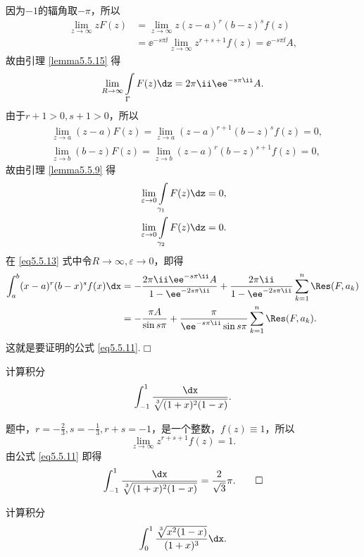 因为$-1$的辐角取$-\pi$，所以
\begin{align*}
\lim_{z\to\infty}zF(z)&=\lim_{z\to\infty}z(z-a)^r(b-z)^sf(z)\\
&=\ee^{-s\pi\ii}\lim_{z\to\infty}z^{r+s+1}f(z)=\ee^{-s\pi\ii}A,
\end{align*}
故由引理 \ref{lemma5.5.15} 得
\[\lim_{R\to\infty}\int\limits_{\Gamma}F(z)\dz=2\pi\ii\ee^{-s\pi\ii}A.\]
由于$r+1>0,s+1>0$，所以
\begin{align*}
&\lim_{z\to a}(z-a)F(z)=\lim_{z\to a}(z-a)^{r+1}(b-z)^sf(z)=0,\\
&\lim_{z\to b}(b-z)F(z)=\lim_{z\to b}(z-a)^{r}(b-z)^{s+1}f(z)=0,
\end{align*}
故由引理 \ref{lemma5.5.9} 得
\begin{align*}
&\lim_{\varepsilon\to0}\int\limits_{\gamma_1}F(z)\dz=0,\\
&\lim_{\varepsilon\to0}\int\limits_{\gamma_2}F(z)\dz=0.
\end{align*}
在 \eqref{eq5.5.13} 式中令$R\to\infty,\varepsilon\to0$，即得
\begin{align*}
\int_a^b(x-a)^r(b-x)^sf(x)\dx&=-\frac{2\pi\ii\ee^{-s\pi\ii}A}{1-\ee^{-2s\pi\ii}}
+\frac{2\pi\ii}{1-\ee^{-2s\pi\ii}}\sum_{k=1}^n\Res(F,a_k)\\
&=-\frac{\pi A}{\sin s\pi}+\frac\pi{\ee^{-s\pi\ii}\sin
s\pi}\sum_{k=1}^n\Res(F,a_k).
\end{align*}
这就是要证明的公式 \eqref{eq5.5.11}.\hfill$\Box$
\begin{example}\label{exam5.5.16}
计算积分
\[\int_{-1}^1\frac{\dx}{\sqrt[\leftroot{-1}\uproot{2}3]{(1+x)^2(1-x)}}.\]
\end{example}
\begin{solution}
题中，$r=-\frac23,s=-\frac13,r+s=-1$，是一个整数，$f(z)\equiv1$，所以
\[\lim_{z\to\infty}z^{r+s+1}f(z)=1.\]
由公式 \eqref{eq5.5.11} 即得
\begin{equation*}
  \int_{-1}^1\frac{\dx}{\sqrt[\leftroot{-1}\uproot{2}3]{(1+x)^2(1-x)}} = \frac2{\sqrt3}\pi. \qedhere
\end{equation*}
\end{solution}
\begin{example}\label{exam5.5.17}
计算积分
\[\int_0^1\frac{\sqrt[\leftroot{-1}\uproot{2}3]{x^2(1-x)}}{(1+x)^3}\dx.\]
\end{example}
